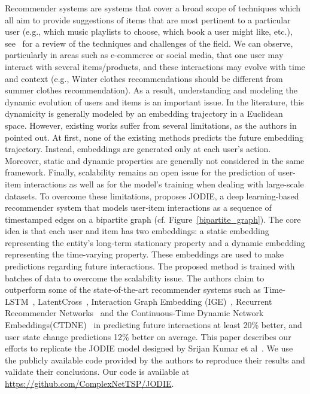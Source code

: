 Recommender systems are systems that cover a broad scope of techniques which all aim to provide suggestions of items that are most pertinent to a particular user (e.g., which music playlists to choose, which book a user might like, etc.), see~\cite{Ricci_Rokach_Shapira_2021} for a review of the techniques and challenges of the field. We can observe, particularly in areas such as  e-commerce or social media, that one user may interact with several items/products, and these interactions may evolve with time and context (e.g., Winter clothes recommendations should be different from summer clothes recommendation). 
As a result,  understanding and modeling the dynamic evolution of users and items is an important issue. In the literature, this dynamicity is generally modeled by an embedding trajectory in a Euclidean space. However, existing works suffer from several limitations, as the authors in \cite{kumar2019predicting} pointed out. At first, none of the existing methods predicts the future embedding trajectory. Instead, embeddings are generated only at each user's action. Moreover, static and dynamic properties are generally not considered in the same framework. Finally, scalability remains an open issue for the prediction of user-item interactions as well as for the model's training when dealing with large-scale datasets. To overcome these limitations, \cite{kumar2019predicting} proposes JODIE, a deep learning-based recommender system that models user‐item interactions as a sequence of timestamped edges on a bipartite graph (cf. Figure~\ref{bipartite_graph}).
The core idea is that each user and item has two embeddings: a static embedding representing the entity's long‐term stationary property
and a dynamic embedding representing the time‐varying property. These embeddings are used to make predictions regarding future interactions. The proposed method is trained with batches of data to overcome the scalability issue.
The authors claim to outperform some of the state-of-the-art recommender systems such as Time-LSTM~\cite{Zhu17}, LatentCross~\cite{Beutel18}, Interaction Graph Embedding (IGE)~\cite{Zhang17}, Recurrent Recommender Networks~\cite{Wu17} and the Continuous-Time Dynamic Network Embeddings(CTDNE)~\cite{Nguyen18} in predicting future interactions  at least 20\% better, and user state change predictions 12\% better on average.
This paper describes our efforts to replicate the JODIE model designed by Srijan Kumar et al~\cite{kumar2019predicting}. 
We use the publicly available code provided by the authors to reproduce
their results and validate their conclusions. Our code is available at \url{https://github.com/ComplexNetTSP/JODIE}.


